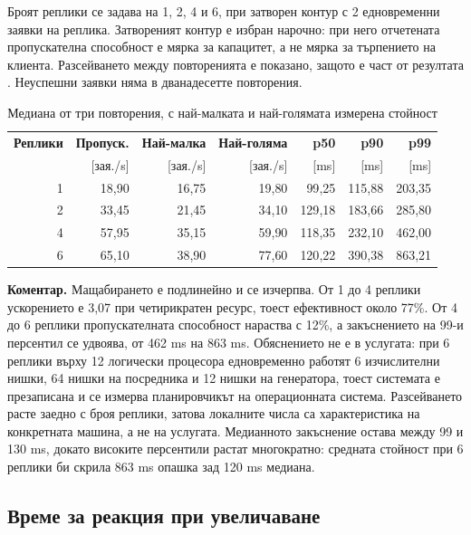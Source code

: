 Броят реплики се задава на 1, 2, 4 и 6, при затворен контур с 2 едновременни заявки на реплика.
Затвореният контур е избран нарочно: при него отчетената пропускателна способност е мярка за
капацитет, а не мярка за търпението на клиента. Разсейването между повторенията е показано, защото
е част от резултата . Неуспешни заявки няма в дванадесетте повторения.

\begin{table}[H]
\caption{Медиана от три повторения, с най-малката и най-голямата измерена стойност}
\label{tab:throughput}
\centering
\small
\begin{tabular}{@{}rrrrrrr@{}}
\toprule
\textbf{Реплики} & \textbf{Пропуск.} & \textbf{Най-малка} & \textbf{Най-голяма} &
\textbf{p50} & \textbf{p90} & \textbf{p99} \\
 & [зая./s] & [зая./s] & [зая./s] & [ms] & [ms] & [ms] \\
\midrule
1 & 18{,}90 & 16{,}75 & 19{,}80 & 99{,}25  & 115{,}88 & 203{,}35 \\
2 & 33{,}45 & 21{,}45 & 34{,}10 & 129{,}18 & 183{,}66 & 285{,}80 \\
4 & 57{,}95 & 35{,}15 & 59{,}90 & 118{,}35 & 232{,}10 & 462{,}00 \\
6 & 65{,}10 & 38{,}90 & 77{,}60 & 120{,}22 & 390{,}38 & 863{,}21 \\
\bottomrule
\end{tabular}
\end{table}

\textbf{Коментар.} Мащабирането е подлинейно и се изчерпва. От 1 до 4 реплики ускорението е
3{,}07 при четирикратен ресурс, тоест ефективност около 77\%. От 4 до 6 реплики пропускателната
способност нараства с 12\%, а закъснението на 99-и персентил се удвоява, от 462 ms на 863 ms.
Обяснението не е в услугата: при 6 реплики върху 12 логически процесора едновременно работят 6
изчислителни нишки, 64 нишки на посредника и 12 нишки на генератора, тоест системата е презаписана
и се измерва планировчикът на операционната система. Разсейването расте заедно с броя реплики,
затова локалните числа са характеристика на конкретната машина, а не на услугата. Медианното
закъснение остава между 99 и 130 ms, докато високите персентили растат многократно: средната
стойност при 6 реплики би скрила 863 ms опашка зад 120 ms медиана.

\subsection{Време за реакция при увеличаване}

